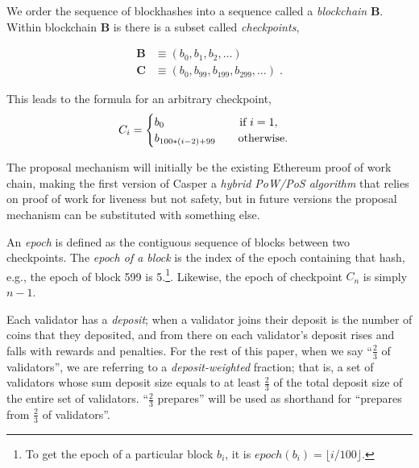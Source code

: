 \documentclass[12pt]{article}
\begin{document}
We order the sequence of blockhashes into a sequence called a \emph{blockchain} $\mathbf{B}$.  Within blockchain $\mathbf{B}$ is there is a subset called \emph{checkpoints},

\begin{equation}
\begin{split}
    \mathbf{B} &\equiv \left( b_0, b_1, b_2, \ldots \right) \\
    \mathbf{C} &\equiv \left( b_0, b_{99}, b_{199}, b_{299}, \ldots \right) \; .
\end{split}
\end{equation}

This leads to the formula for an arbitrary checkpoint,
\begin{equation}
    C_i = \begin{cases}
     b_0 \qquad \qquad \qquad\ \  \textnormal{if } i = 1, \\
     b_{ 100*(i-2) + 99 } \qquad \textnormal{otherwise.}
     \end{cases}
\end{equation}

The proposal mechanism will initially be the existing Ethereum proof of work chain, making the first version of Casper a \textit{hybrid PoW/PoS algorithm} that relies on proof of work for liveness but not safety, but in future versions the proposal mechanism can be substituted with something else.

An \emph{epoch} is defined as the contiguous sequence of blocks between two checkpoints.  The \textit{epoch of a block} is the index of the epoch containing that hash, e.g., the epoch of block 599 is 5.\footnote{To get the epoch of a particular block $b_i$, it is $epoch(b_i) = \lfloor i / 100 \rfloor$.}. Likewise, the epoch of checkpoint $C_n$ is simply $n - 1$.



Each validator has a \emph{deposit}; when a validator joins their deposit is the number of coins that they deposited, and from there on each validator's deposit rises and falls with rewards and penalties. For the rest of this paper, when we say ``$\frac{2}{3}$ of validators'', we are referring to a \emph{deposit-weighted} fraction; that is, a set of validators whose sum deposit size equals to at least $\frac{2}{3}$ of the total deposit size of the entire set of validators. ``$\frac{2}{3}$ prepares'' will be used as shorthand for ``prepares from $\frac{2}{3}$ of validators''.
\end{document}
